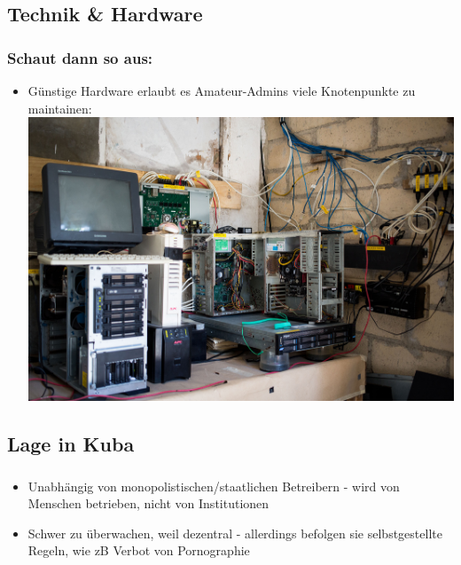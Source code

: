 \subsection{Technik \& Hardware}

\begin{frame}
\frametitle{Schaut dann so aus:}
	\begin{itemize}
		\item Günstige Hardware erlaubt es Amateur-Admins viele Knotenpunkte zu maintainen:
			\includegraphics[width=\textwidth]{images/snet_pillar.jpg}
	\end{itemize}
\end{frame}

\subsection{Lage in Kuba}

\begin{frame}
\frametitle{}
	\begin{itemize}
		\item Unabhängig von monopolistischen/staatlichen Betreibern - wird von Menschen betrieben, nicht von Institutionen
		\item Schwer zu überwachen, weil dezentral - allerdings befolgen sie selbstgestellte Regeln, wie zB Verbot von Pornographie
	\end{itemize}
\end{frame}
